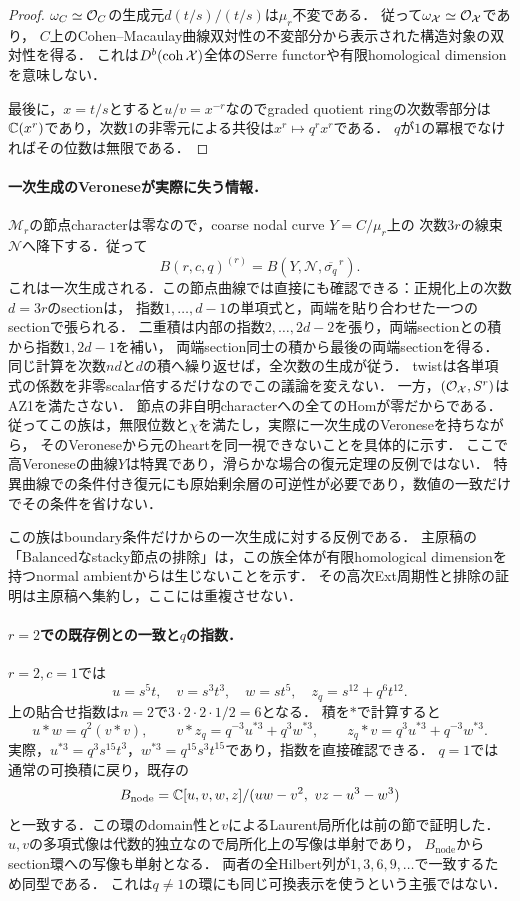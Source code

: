 \documentclass[11pt,a4paper]{ltjsarticle}
\begin{document}
\begin{proof}
$\omega_C\simeq\mathcal O_C$の生成元$d(t/s)/(t/s)$は$\mu_r$不変である．
従って$\omega_{\mathcal X}\simeq\mathcal O_{\mathcal X}$であり，
$C$上のCohen--Macaulay曲線双対性の不変部分から表示された構造対象の双対性を得る．
これは$D^b(\operatorname{coh}\mathcal X)$全体のSerre functorや有限homological dimensionを意味しない．

最後に，$x=t/s$とすると$u/v=x^{-r}$なのでgraded quotient ringの次数零部分は
$\mathbb C(x^r)$であり，次数1の非零元による共役は$x^r\mapsto q^r x^r$である．
$q$が$1$の冪根でなければその位数は無限である．
\end{proof}

\paragraph{一次生成のVeroneseが実際に失う情報．}
$\mathcal M_r$の節点characterは零なので，coarse nodal curve $Y=C/\mu_r$上の
次数$3r$の線束$\mathcal N$へ降下する．従って
\[
 B(r,c,q)^{(r)}=B(Y,\mathcal N,\overline{\sigma_q}^{\,r}).
\]
これは一次生成される．この節点曲線では直接にも確認できる：正規化上の次数$d=3r$のsectionは，
指数$1,\ldots,d-1$の単項式と，両端を貼り合わせた一つのsectionで張られる．
二重積は内部の指数$2,\ldots,2d-2$を張り，両端sectionとの積から指数$1,2d-1$を補い，
両端section同士の積から最後の両端sectionを得る．
同じ計算を次数$nd$と$d$の積へ繰り返せば，全次数の生成が従う．
twistは各単項式の係数を非零scalar倍するだけなのでこの議論を変えない．
一方，$(\mathcal O_{\mathcal X},S^r)$はAZ1を満たさない．
節点の非自明characterへの全てのHomが零だからである．
従ってこの族は，無限位数と$\chi$を満たし，実際に一次生成のVeroneseを持ちながら，
そのVeroneseから元のheartを同一視できないことを具体的に示す．
ここで高Veroneseの曲線$Y$は特異であり，滑らかな場合の復元定理の反例ではない．
特異曲線での条件付き復元にも原始剰余層の可逆性が必要であり，数値の一致だけでその条件を省けない．

この族はboundary条件だけからの一次生成に対する反例である．
主原稿の「Balancedなstacky節点の排除」は，この族全体が有限homological dimensionを持つnormal ambientからは生じないことを示す．
その高次Ext周期性と排除の証明は主原稿へ集約し，ここには重複させない．

\paragraph{$r=2$での既存例との一致と$q$の指数．}
$r=2,c=1$では
\[
 u=s^5t,\quad v=s^3t^3,\quad w=st^5,\quad z_q=s^{12}+q^6t^{12}.
\]
上の貼合せ指数は$n=2$で$3\cdot2\cdot2\cdot1/2=6$となる．
積を$*$で計算すると
\[
 u*w=q^2(v*v),\qquad
 v*z_q=q^{-3}u^{*3}+q^3w^{*3},\qquad
 z_q*v=q^3u^{*3}+q^{-3}w^{*3}.
\]
実際，$u^{*3}=q^3s^{15}t^3$，$w^{*3}=q^{15}s^3t^{15}$であり，指数を直接確認できる．
$q=1$では通常の可換積に戻り，既存の
\[
 B_{\mathrm{node}}=\C[u,v,w,z]/(uw-v^2,\ vz-u^3-w^3)
\]
と一致する．この環のdomain性と$v$によるLaurent局所化は前の節で証明した．
$u,v$の多項式像は代数的独立なので局所化上の写像は単射であり，
$B_{\mathrm{node}}$からsection環への写像も単射となる．
両者の全Hilbert列が$1,3,6,9,\ldots$で一致するため同型である．
これは$q\ne1$の環にも同じ可換表示を使うという主張ではない．
\end{document}
